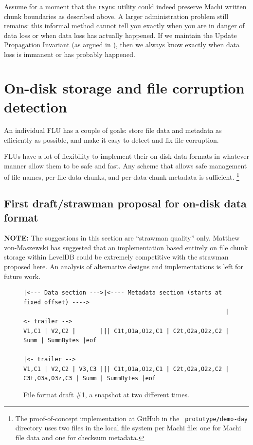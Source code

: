 \documentclass[preprint,10pt]{sigplanconf}
\begin{document}
Assume for a moment that the {\tt rsync} utility could indeed preserve
Machi written chunk boundaries as described above.  A larger
administration problem still remains: this informal method cannot tell
you exactly when you are in danger of data loss or when data loss has
actually happened.  If we maintain the Update Propagation Invariant
(as argued in \cite{machi-chain-manager-design}),
then we always know exactly when data loss is immanent or has
probably happened.

\section{On-disk storage and file corruption detection}
\label{sec:on-disk}

An individual FLU has a couple of goals: store file data and metadata
as efficiently as possible, and make it easy to detect and fix file
corruption.

FLUs have a lot of flexibility to implement their on-disk data formats in
whatever manner allow them to be safe and fast.  Any scheme that
allows safe management of file names, per-file data chunks, and
per-data-chunk metadata is sufficient.
\footnote{The proof-of-concept implementation at GitHub in the {\tt
    prototype/demo-day} directory uses two files in the local file
  system per Machi file: one for Machi file data and one for
  checksum metadata.}

\subsection{First draft/strawman proposal for on-disk data format}
\label{sub:on-disk-data-format}

{\bf NOTE:} The suggestions in this section are ``strawman quality''
only.  Matthew von-Maszewski has suggested that an implementation
based entirely on file chunk storage within LevelDB could be extremely
competitive with the strawman proposed here.  An analysis of
alternative designs and implementations is left for future work.

\begin{figure}
\begin{verbatim}
|<--- Data section --->|<---- Metadata section (starts at fixed offset) ---->
                                                          |<- trailer -->
V1,C1 | V2,C2 |       ||| C1t,O1a,O1z,C1 | C2t,O2a,O2z,C2 | Summ | SummBytes |eof
                                                                           |<- trailer -->
V1,C1 | V2,C2 | V3,C3 ||| C1t,O1a,O1z,C1 | C2t,O2a,O2z,C2 | C3t,O3a,O3z,C3 | Summ | SummBytes |eof
\end{verbatim}
\caption{File format draft \#1, a snapshot at two different times.}
\label{fig:file-format-d1}
\end{figure}
\end{document}
